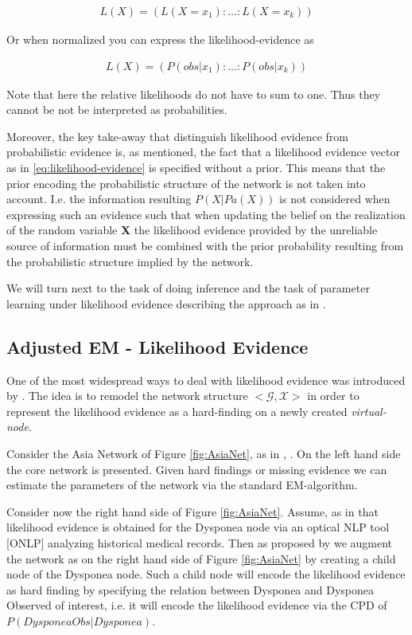 \documentclass[11pt]{article}
\begin{document}
\begin{article}
\begin{align} \label{eq:likelihood-evidence}
 L(X) = (L(X = x_1): ... : L(X = x_k))
\end{align}

Or when normalized you can express the likelihood-evidence as 

\begin{align} \label{eq:normalized-likelihood-evidence}
 L(X) = (P(obs | x_1): ... : P(obs | x_k))
\end{align}

Note that here the relative likelihoods do not have to sum to
one. Thus they cannot be not be interpreted as probabilities.

Moreover, the key take-away that distinguish likelihood evidence
from probabilistic evidence is, as mentioned, the fact that a
likelihood evidence vector as in \ref{eq:likelihood-evidence} is
specified without a prior. This means that the prior encoding the
probabilistic structure of the network is not taken into
account. I.e. the information resulting \(P(X|Pa(X))\) is not
considered when expressing such an evidence such that when
updating the belief on the realization of the random variable \textbf{X}
the likelihood evidence provided by the unreliable source of
information must be combined with the prior probability resulting
from the probabilistic structure implied by the network.

We will turn next to the task of doing inference and the task of
parameter learning under likelihood evidence describing the
approach as in \cite{Wasserkrug_all}.

\subsection{Adjusted EM - Likelihood Evidence}
\label{sec:orgbb7c2ea}

One of the most widespread ways to deal with likelihood evidence
was introduced by \cite{pearl2014probabilistic}. The idea is to
remodel the network structure \(<\mathscr{G}, \mathscr{X}>\) in order
to represent the likelihood evidence as a hard-finding on a newly
created \emph{virtual-node}.

Consider the Asia Network of Figure \ref{fig:AsiaNet}, as in
\cite{Wasserkrug_all}, \cite{Mrad_2015}. On the left hand side the core
network is presented. Given hard findings or missing evidence we
can estimate the parameters of the network via the standard
EM-algorithm.

Consider now the right hand side of Figure \ref{fig:AsiaNet}. Assume,
as in \cite{Wasserkrug_all} that likelihood evidence is obtained for
the Dysponea node via an optical NLP tool [ONLP] analyzing
historical medical records. Then as proposed by
\cite{pearl2014probabilistic} we augment the network as on the right
hand side of Figure \ref{fig:AsiaNet} by creating a child node of the
Dysponea node. Such a child node will encode the likelihood
evidence as hard finding by specifying the relation between
Dysponea and Dysponea Observed of interest, i.e. it will encode the
likelihood evidence via the CPD of \(P(DysponeaObs | Dysponea)\).


\end{article}
\end{document}
